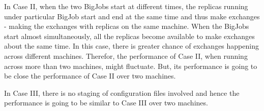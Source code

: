 \documentclass[a4paper,10pt]{article}
\newcommand{\athotanote}[1]{ {\textcolor{green} { ***athota: #1 }}}
\newcommand{\athotanote}[1]{}
\begin{document}
In Case II, when the two BigJobs start at different times, the replicas running under particular BigJob start and end at the same time and thus make exchanges - making the exchanges with replicas on the same machine. When the BigJobs start almost simultaneously, all the replicas become available to make exchanges about the same time. In this case, there is greater chance of exchanges happening across different machines. Therefor, the performance of Case II, when running across more than two machines, might fluctuate. But, its performance is going to be close the performance of Case II over two machines. 

In Case III, there is no staging of configuration files involved and hence the performance is going to be similar to Case III over two machines. 


\end{document}
